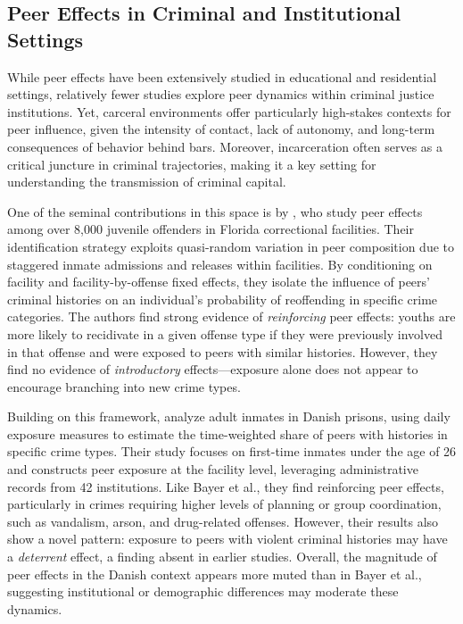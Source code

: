 \documentclass[12pt, a4paper]{article}
\begin{document}
\subsection{Peer Effects in Criminal and Institutional Settings}

While peer effects have been extensively studied in educational and residential settings, relatively fewer studies explore peer dynamics within criminal justice institutions. Yet, carceral environments offer particularly high-stakes contexts for peer influence, given the intensity of contact, lack of autonomy, and long-term consequences of behavior behind bars. Moreover, incarceration often serves as a critical juncture in criminal trajectories, making it a key setting for understanding the transmission of criminal capital.

One of the seminal contributions in this space is by \citet{bayer2009building}, who study peer effects among over 8,000 juvenile offenders in Florida correctional facilities. Their identification strategy exploits quasi-random variation in peer composition due to staggered inmate admissions and releases within facilities. By conditioning on facility and facility-by-offense fixed effects, they isolate the influence of peers’ criminal histories on an individual’s probability of reoffending in specific crime categories. The authors find strong evidence of \textit{reinforcing} peer effects: youths are more likely to recidivate in a given offense type if they were previously involved in that offense and were exposed to peers with similar histories. However, they find no evidence of \textit{introductory} effects—exposure alone does not appear to encourage branching into new crime types.

Building on this framework, \citet{damm2020prison} analyze adult inmates in Danish prisons, using daily exposure measures to estimate the time-weighted share of peers with histories in specific crime types. Their study focuses on first-time inmates under the age of 26 and constructs peer exposure at the facility level, leveraging administrative records from 42 institutions. Like Bayer et al., they find reinforcing peer effects, particularly in crimes requiring higher levels of planning or group coordination, such as vandalism, arson, and drug-related offenses. However, their results also show a novel pattern: exposure to peers with violent criminal histories may have a \textit{deterrent} effect, a finding absent in earlier studies. Overall, the magnitude of peer effects in the Danish context appears more muted than in Bayer et al., suggesting institutional or demographic differences may moderate these dynamics.
\end{document}
